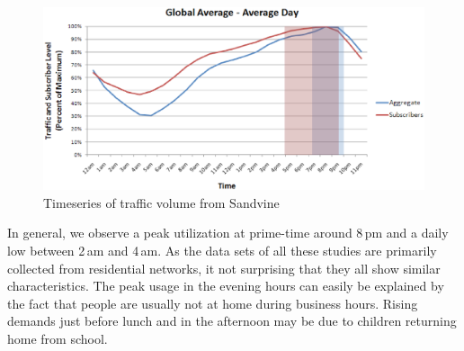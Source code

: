 \begin{figure}[tbp]
\centering
\includegraphics[width=0.85\linewidth]{figures/sandvine-tod.eps}
\renewcommand{\capname}{Timeseries of traffic volume from Sandvine\xspace}
\caption[\capname]{\capname~\cite{sandvine}}
\label{fig:related:tod-sandvine}
\end{figure}

In general, we observe a peak utilization at prime-time around 8\,pm and a
daily low between 2\,am and 4\,am. As the data sets of all these studies are
primarily collected from residential networks, it not surprising that they all
show similar characteristics. The peak usage in the evening hours can easily be
explained by the fact that people are usually not at home during business
hours. Rising demands just before lunch and in the afternoon may be due to
children returning home from school.

